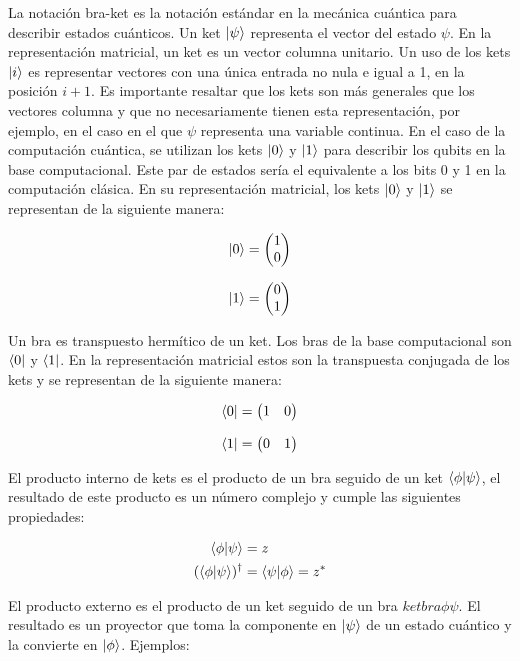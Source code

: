 La notación bra-ket es la notación estándar en la mecánica cuántica para describir estados cuánticos. Un ket $\ket{\psi}$ representa el vector del estado $\psi$. En la representación matricial, un ket es un vector columna unitario. Un uso de los kets $\ket{i}$ es representar vectores con una única entrada no nula e igual a 1, en la posición $i+1$. Es importante resaltar que los kets son más generales que los vectores columna y que no necesariamente tienen esta representación, por ejemplo, en el caso en el que $\psi$ representa una variable continua. En el caso de la computación cuántica, se utilizan los kets $\ket{0}$ y $\ket{1}$ para describir los qubits en la base computacional. Este par de estados sería el equivalente a los bits 0 y 1 en la computación clásica. En su representación matricial, los kets $\ket{0}$ y $\ket{1}$ se representan de la siguiente manera:

\[\ket{0} = \begin{pmatrix} 1 \\ 0 \end{pmatrix}\]

\[\ket{1} = \begin{pmatrix} 0 \\ 1 \end{pmatrix}\]

Un bra es transpuesto hermítico de un ket. Los bras de la base computacional son $\bra{0}$ y $\bra{1}$. En la representación matricial estos son la transpuesta conjugada de los kets y se representan de la siguiente manera:

\[\bra{0} = \begin{pmatrix} 1 & 0 \end{pmatrix}\]

\[\bra{1} = \begin{pmatrix} 0 & 1 \end{pmatrix}\]

El producto interno de kets es el producto de un bra seguido de un ket $\braket{\phi}{\psi}$, el resultado de este producto es un número complejo y cumple las siguientes propiedades:

\begin{align}
    \braket{\phi}{\psi} &= z \\
    (\braket{\phi}{\psi})^\dagger &= \braket{\psi}{\phi} = z^*
\end{align}

El producto externo es el producto de un ket seguido de un bra $ketbra{\phi}{\psi}$. El resultado es un proyector que toma la componente en $\ket{\psi}$ de un estado cuántico y la convierte en $\ket{\phi}$. Ejemplos:

